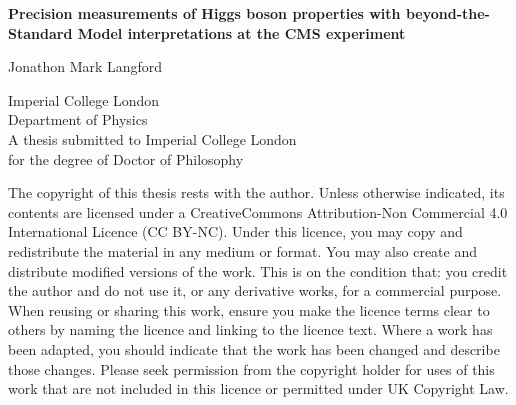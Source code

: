 \begin{titlepage}
    \begin{center}
        \vspace*{2cm}
        
        \huge{\textbf{Precision measurements of Higgs boson properties with beyond-the-Standard Model interpretations at the CMS experiment}}

        \vspace{1.5cm}
        \normalsize
        Jonathon Mark Langford
        
        \vspace{0.5cm}
        Imperial College London\\
        Department of Physics\\

        \vspace{5cm}
        A thesis submitted to Imperial College London\\
        for the degree of Doctor of Philosophy\\
        
    \end{center}
\end{titlepage}

The copyright of this thesis rests with the author. Unless otherwise indicated, its contents are licensed under a CreativeCommons Attribution-Non Commercial 4.0 International Licence (CC BY-NC). Under this licence, you may copy and redistribute the material in any medium or format. You may also create and distribute modified versions of the work. This is on the condition that: you credit the author and do not use it, or any derivative works, for a commercial purpose. When reusing or sharing this work, ensure you make the licence terms clear to others by naming the licence and linking to the licence text. Where a work has been adapted, you should indicate that the work has been changed and describe those changes. Please seek permission from the copyright holder for uses of this work that are not included in this licence or permitted under UK Copyright Law.
